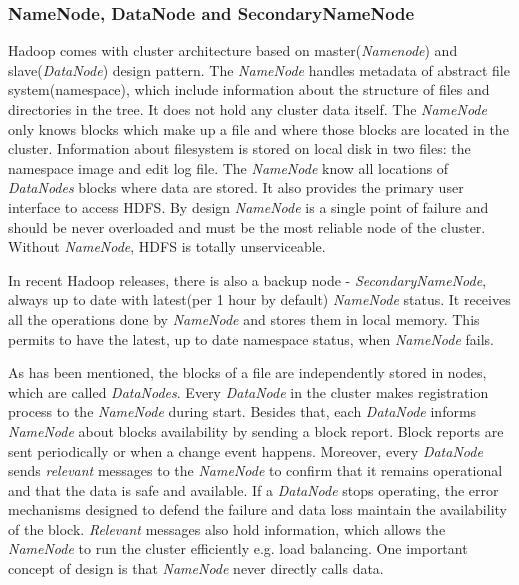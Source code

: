 \documentclass[a4paper,12pt,oneside]{report}
\begin{document}
		\subsubsection{NameNode, DataNode and SecondaryNameNode}
Hadoop comes with cluster architecture based on master(\textit{Namenode}) and\\ slave(\textit{DataNode}) design pattern. 
The \textit{NameNode} handles metadata of abstract file system(namespace), which include
information about the structure of files and directories in the tree.  It does not hold any cluster data itself. 
The  \textit{NameNode} only knows blocks which make up a file and where those blocks are located in the cluster.
Information about filesystem is stored on local disk in two files: the namespace image and edit log file. 
The \textit{NameNode} know all locations of  \textit{DataNodes} blocks where data 
are stored. It also provides the primary user interface to access HDFS. 
By design \textit{NameNode}  is a single point of failure and should be never overloaded and must 
be the most reliable node of the cluster.  Without \textit{NameNode}, HDFS is totally unserviceable. 

In recent Hadoop releases, there is also a backup node - \textit{SecondaryNameNode}, always up to date 
with latest(per 1 hour by default) \textit{NameNode} status. It receives all the operations done by \textit{NameNode} and 
stores them in local memory. This permits to have the latest, up to date namespace status, when \textit{NameNode} fails. 
        
As has been mentioned, the blocks of a file are independently stored in nodes, which are called
\textit{DataNodes}. Every \textit{DataNode} in the cluster makes registration process to the \textit{NameNode} during start. 
Besides that, each \textit{DataNode} informs \textit{NameNode} about blocks availability by sending a block report. 
Block reports are sent periodically or when a change event happens. Moreover, every \textit{DataNode} sends 
\emph{relevant} messages to the \textit{NameNode} to confirm that
it remains operational and that the data is safe and available. If a \textit{DataNode} stops operating, the error 
mechanisms designed to defend the failure and data loss maintain the availability of the block.
\emph{Relevant} messages also hold information, which allows the \textit{NameNode} to run the cluster efficiently e.g. 
load balancing. One important concept of design  is that \textit{NameNode} never directly calls data.
		
\end{document}
